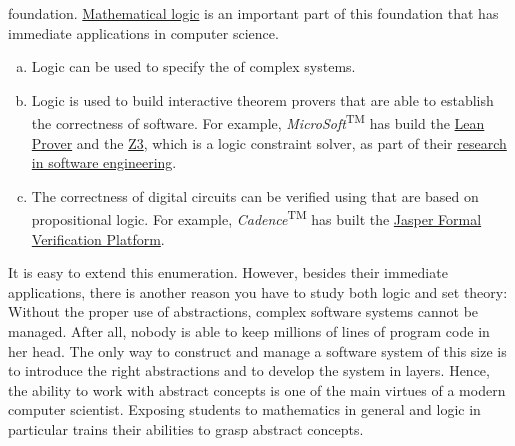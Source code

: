 foundation.  \href{https://en.wikipedia.org/wiki/Mathematical_logic}{Mathematical logic} 
is an important part of this foundation that has immediate applications in computer science. 
\begin{enumerate}[(a)]
\item Logic can be used to specify the  of complex systems.  
\item Logic is used to build interactive theorem provers that are able to establish the correctness of
      software.  For example, \textsl{MicroSoft}\textsuperscript{TM} has build the
      \href{https://leanprover.github.io}{Lean Prover} and the
      \href{https://www.microsoft.com/en-us/research/project/z3-3/}{Z3}, which is a logic constraint solver, as
      part of their 
      \href{https://www.microsoft.com/en-us/research/group/research-software-engineering-rise/}{research in
        software engineering}. 
\item The correctness of digital circuits can be verified using  that are based on
      propositional logic.  For example, \textsl{Cadence}\textsuperscript{TM} has built the
      \href{https://www.cadence.com/en_US/home/tools/system-design-and-verification/formal-and-static-verification.html}{Jasper
        Formal Verification Platform}.
\end{enumerate}
It is easy to extend this enumeration.  However, besides their immediate applications, 
there is another reason you have to study both logic and set theory: Without the proper use of
{\color{blue}abstractions}, complex software systems cannot be managed.  After all, nobody is able to keep
millions of lines of program code in her head.  The only way to construct and manage a software system of this
size is to introduce the right abstractions and to develop the system in layers.  Hence, the ability
to work with abstract concepts is one of the main virtues of a modern computer scientist.  
Exposing students to mathematics in general and logic in particular trains their abilities to grasp abstract concepts.

